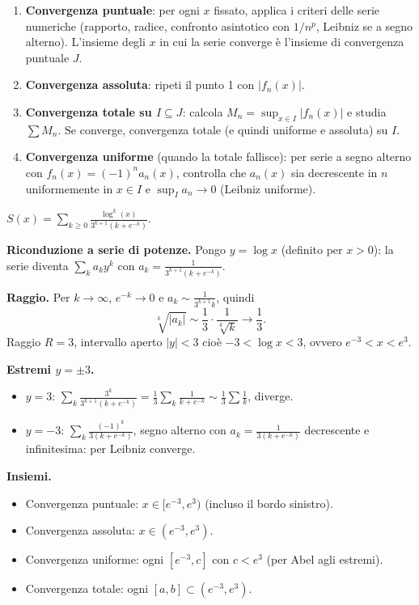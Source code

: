 \documentclass[11pt,a4paper,openany]{book}
\theoremstyle{plain}
\theoremstyle{definition}
\theoremstyle{remark}
\begin{document}
\begin{ricetta}[title={Studio di una serie di funzioni $\sum f_n(x)$}]
\begin{enumerate}
\item \textbf{Convergenza puntuale}: per ogni $x$ fissato, applica i
   criteri delle serie numeriche (rapporto, radice, confronto asintotico
   con $1/n^p$, Leibniz se a segno alterno). L'insieme degli $x$ in cui
   la serie converge \`e l'insieme di convergenza puntuale $J$.
\item \textbf{Convergenza assoluta}: ripeti il punto 1 con $|f_n(x)|$.
\item \textbf{Convergenza totale su $I\subseteq J$}: calcola
   $M_n=\sup_{x\in I}|f_n(x)|$ e studia $\sum M_n$. Se converge,
   convergenza totale (e quindi uniforme e assoluta) su $I$.
\item \textbf{Convergenza uniforme} (quando la totale fallisce): per
   serie a segno alterno con $f_n(x)=(-1)^n a_n(x)$, controlla che
   $a_n(x)$ sia decrescente in $n$ uniformemente in $x\in I$ e
   $\sup_I a_n\to 0$ (Leibniz uniforme).
\end{enumerate}
\end{ricetta}

\begin{esempio}[title={Tipo Sapienza --- 22/1/2024}]
$\displaystyle S(x)=\sum_{k\ge 0}\frac{\log^k(x)}{3^{k+1}(k+e^{-k})}$.

\textbf{Riconduzione a serie di potenze.} Pongo $y=\log x$ (definito
per $x>0$): la serie diventa
$\sum_k a_k y^k$ con $a_k=\frac{1}{3^{k+1}(k+e^{-k})}$.

\textbf{Raggio.} Per $k\to\infty$, $e^{-k}\to 0$ e $a_k\sim
\frac{1}{3^{k+1}k}$, quindi
\[
\sqrt[k]{|a_k|}\sim\frac{1}{3}\cdot\frac{1}{\sqrt[k]{k}}\to\frac13.
\]
Raggio $R=3$, intervallo aperto $|y|<3$ cio\`e $-3<\log x<3$,
ovvero $e^{-3}<x<e^3$.

\textbf{Estremi $y=\pm 3$.} 
\begin{itemize}
\item $y=3$: $\sum_k\frac{3^k}{3^{k+1}(k+e^{-k})}=\frac13\sum_k\frac{1}{k+e^{-k}}\sim\frac13\sum\frac1k$, diverge.
\item $y=-3$: $\sum_k\frac{(-1)^k}{3(k+e^{-k})}$, segno alterno con
$a_k=\frac{1}{3(k+e^{-k})}$ decrescente e infinitesima: per Leibniz converge.
\end{itemize}

\textbf{Insiemi.}
\begin{itemize}
\item Convergenza puntuale: $x\in[e^{-3},e^3)$ (incluso il bordo sinistro).
\item Convergenza assoluta: $x\in(e^{-3},e^3)$.
\item Convergenza uniforme: ogni $[e^{-3},c]$ con $c<e^3$ (per Abel agli estremi).
\item Convergenza totale: ogni $[a,b]\subset(e^{-3},e^3)$.
\end{itemize}
\end{esempio}
\end{document}
